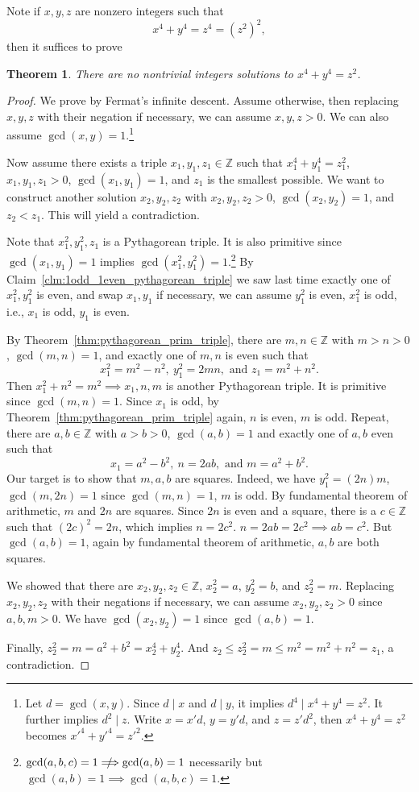 \documentclass{amsbook}
\theoremstyle{plain}
\newtheorem{theorem}{Theorem}[chapter] %
\theoremstyle{definition}
\theoremstyle{remark}
\numberwithin{equation}{chapter}
\numberwithin{figure}{chapter}
\newcommand*{\notimply}{\mathrel{\rlap{\hskip .5em/}}\Longrightarrow}
\newcommand{\Z}{\mathbb{Z}}
\begin{document}
Note if $x, y, z$ are nonzero integers such that 
\[
x^4 + y^4 = z^4 = (z^2)^2,
\]
then it suffices to prove 
\begin{theorem}
There are no nontrivial integers solutions to $x^4 + y^4 = z^2$.
\end{theorem}
\begin{proof}
We prove by Fermat's infinite descent. Assume otherwise, then replacing $x, y, z$ with their negation if necessary, we can assume $x, y, z > 0$. We can also assume $\gcd (x, y) = 1$.\footnote{Let $d = \gcd (x, y)$. Since $d \mid x$ and $d \mid y$, it implies $d^4 \mid x^4 + y^4 = z^2$. It further implies $d^2 \mid z$. Write $x = x' d$, $y = y' d$, and $z = z' d^2$, then $x^4 + y^4 = z^2$ becomes $x'^4 + y'^4 = z'^2$.}

Now assume there exists a triple $x_1, y_1, z_1 \in \Z$ such that $x_1^4 + y_1^4 = z_1^2$, $x_1, y_1, z_1 > 0$, $\gcd (x_1, y_1) = 1$, and $z_1$ is the smallest possible. We want to construct another solution $x_2, y_2, z_2$ with $x_2, y_2, z_2 > 0$, $\gcd (x_2, y_2) = 1$, and $z_2 < z_1$. This will yield a contradiction.

Note that $x_1^2, y_1^2, z_1$ is a Pythagorean triple. It is also primitive since $\gcd (x_1, y_1) = 1$ implies $\gcd (x_1^2, y_1^2) = 1$.\footnote{$\gcd (a, b, c) = 1 \notimply \gcd (a, b) = 1$ necessarily but $\gcd (a, b) = 1 \implies \gcd (a, b, c) = 1$.} By Claim~\ref{clm:1odd_1even_pythagorean_triple} we saw last time exactly one of $x_1^2, y_1^2$ is even, and swap $x_1, y_1$ if necessary, we can assume $y_1^2$ is even, $x_1^2$ is odd, i.e., $x_1$ is odd, $y_1$ is even.

By Theorem~\ref{thm:pythagorean_prim_triple}, there are $m, n \in \Z$ with $m > n > 0$, $\gcd (m, n) = 1$, and exactly one of $m, n$ is even such that 
\[
x_1^2 = m^2 - n^2, ~y_1^2 = 2mn, \text{ and } z_1 = m^2 + n^2.
\]
Then $x_1^2 + n^2 = m^2 \implies x_1, n, m$ is another Pythagorean triple. It is primitive since $\gcd (m, n) = 1$. Since $x_1$ is odd, by Theorem~\ref{thm:pythagorean_prim_triple} again, $n$ is even, $m$ is odd. Repeat, there are $a, b \in \Z$ with $a > b > 0$, $\gcd (a, b) = 1$ and exactly one of $a, b$ even such that 
\[
x_1 = a^2 - b^2, ~n = 2ab, \text{ and } m = a^2 + b^2.
\]
Our target is to show that $m, a, b$ are squares. Indeed, we have $y_1^2 = (2n)m$, $\gcd (m, 2n) = 1$ since $\gcd (m, n) = 1$, $m$ is odd. By fundamental theorem of arithmetic, $m$ and $2n$ are squares. Since $2n$ is even and a square, there is a $c \in \Z$ such that $(2c)^2 = 2n$, which implies $n = 2c^2$. $n = 2 ab = 2c^2 \implies ab = c^2$. But $\gcd (a, b) = 1$, again by fundamental theorem of arithmetic, $a, b$ are both squares.

We showed that there are $x_2, y_2, z_2 \in \Z$, $x_2^2 = a$, $y_2^2 = b$, and $z_2^2 = m$. Replacing $x_2, y_2, z_2$ with their negations if necessary, we can assume $x_2, y_2, z_2 > 0$ since $a, b, m > 0$. We have $\gcd (x_2, y_2) = 1$ since $\gcd (a, b) = 1$.

Finally, $z_2^2 = m = a^2 + b^2 = x_2^4 + y_2^4$. And $z_2 \leqslant z_2^2 = m \leqslant m^2 = m^2 + n^2 = z_1$, a contradiction.
\end{proof}
\end{document}
